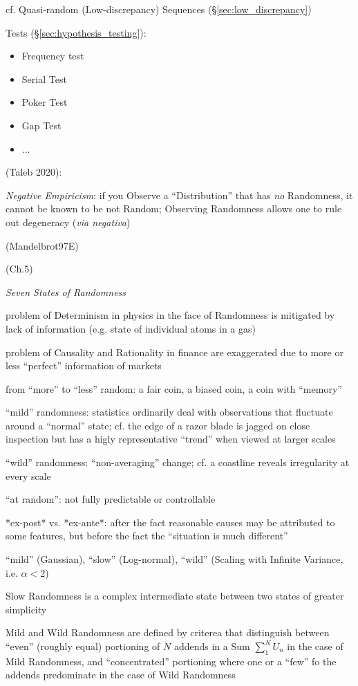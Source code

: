 cf. Quasi-random (Low-discrepancy) Sequences (\S\ref{sec:low_discrepancy})

Tests (\S\ref{sec:hypothesis_testing}):
\begin{itemize}
  \item Frequency test
  \item Serial Test
  \item Poker Test
  \item Gap Test
  \item ...
\end{itemize}

(Taleb 2020):

\emph{Negative Empiricism}: if you Observe a ``Distribution'' that has \emph{no}
Randomness, it cannot be known to be not Random; Observing Randomness allows one
to rule out degeneracy (\emph{via negativa})

(Mandelbrot97E)

(Ch.5)

\emph{Seven States of Randomness}

problem of Determinism in physics in the face of Randomness is mitigated by lack
of information (e.g. state of individual atoms in a gas)

problem of Causality and Rationality in finance are exaggerated due to more or
less ``perfect'' information of markets

from ``more'' to ``less'' random: a fair coin, a biased coin, a coin with
``memory''

``mild'' randomness: statistics ordinarily deal with observations that fluctuate
around a ``normal'' state; cf. the edge of a razor blade is jagged on close
inspection but has a higly representative ``trend'' when viewed at larger scales

``wild'' randomness: ``non-averaging'' change; cf. a coastline reveals
irregularity at every scale

``at random'': not fully predictable or controllable

*ex-post* vs. *ex-ante*: after the fact reasonable causes may be attributed to
some features, but before the fact the ``situation is much different''

``mild'' (Gaussian), ``slow'' (Log-normal), ``wild'' (Scaling with Infinite
Variance, i.e. $\alpha < 2$)

Slow Randomness is a complex intermediate state between two states of greater
simplicity

Mild and Wild Randomness are defined by criterea that distinguish between
``even'' (roughly equal) portioning of $N$ addends in a Sum $\sum_1^N U_n$ in
the case of Mild Randomness, and ``concentrated'' portioning where one or a
``few'' fo the addends predominate in the case of Wild Randomness

